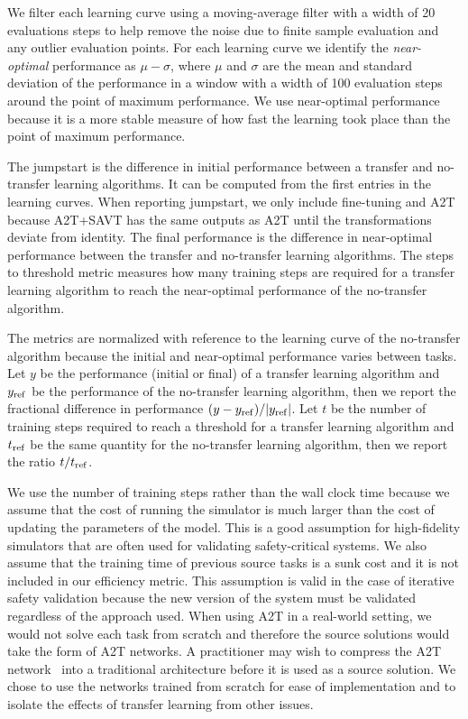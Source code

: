 We filter each learning curve using a moving-average filter with a width of \num{20} evaluations steps to help remove the noise due to finite sample evaluation and any outlier evaluation points. For each learning curve we identify the \emph{near-optimal} performance as $\mu - \sigma$, where $\mu$ and $\sigma$ are the mean and standard deviation of the performance in a window with a width of \num{100} evaluation steps around the point of maximum performance. We use near-optimal performance because it is a more stable measure of how fast the learning took place than the point of maximum performance.

The jumpstart is the difference in initial performance between a transfer and no-transfer learning algorithms. It can be computed from the first entries in the learning curves. When reporting jumpstart, we only include fine-tuning and A2T because A2T+SAVT has the same outputs as A2T until the transformations deviate from identity. The final performance is the difference in near-optimal performance between the transfer and no-transfer learning algorithms. The steps to threshold metric measures how many training steps are required for a transfer learning algorithm to reach the near-optimal performance of the no-transfer algorithm.

The metrics are normalized with reference to the learning curve of the no-transfer algorithm because the initial and near-optimal performance varies between tasks. Let $y$ be the performance (initial or final) of a transfer learning algorithm and $y_{\rm ref}$ be the performance of the no-transfer learning algorithm, then we report the fractional difference in performance $(y - y_{\rm ref})/|y_{\rm ref}|$. Let $t$ be the number of training steps required to reach a threshold for a transfer learning algorithm and $t_{\rm ref}$ be the same quantity for the no-transfer learning algorithm, then we report the ratio $t / t_{\rm ref}$.

We use the number of training steps rather than the wall clock time because we assume that the cost of running the simulator is much larger than the cost of updating the parameters of the model. This is a good assumption for high-fidelity simulators that are often used for validating safety-critical systems. We also assume that the training time of previous source tasks is a sunk cost and it is not included in our efficiency metric. This assumption is valid in the case of iterative safety validation because the new version of the system must be validated regardless of the approach used. When using A2T in a real-world setting, we would not solve each task from scratch and therefore the source solutions would take the form of A2T networks. A practitioner may wish to compress the A2T network~\cite{julian2019deep} into a traditional architecture before it is used as a source solution. We chose to use the networks trained from scratch for ease of implementation and to isolate the effects of transfer learning from other issues.


